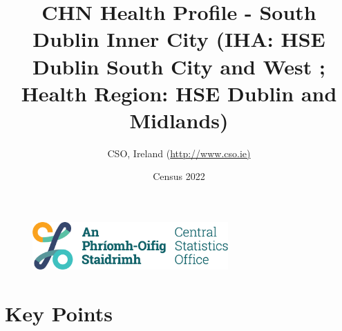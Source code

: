 \documentclass{article}
\title{CHN Health Profile - South Dublin Inner City (IHA: HSE Dublin South City and West ;  Health Region: HSE Dublin and Midlands) }
\date{Census 2022}
\author{CSO, Ireland  (\url{http://www.cso.ie)}}
\begin{document}


\begin{figure}
	\centering
\includegraphics[width =75mm]{../figures/CSO_Logo.png}
\end{figure}

				 
		   
						  
														  
																																													
												 
			 
\maketitle
					
													   
				 
						 
																																																																											   
				 
				  
  \pagebreak
    	    \tableofcontents

\pagebreak


\section{Key Points}
\end{document}
